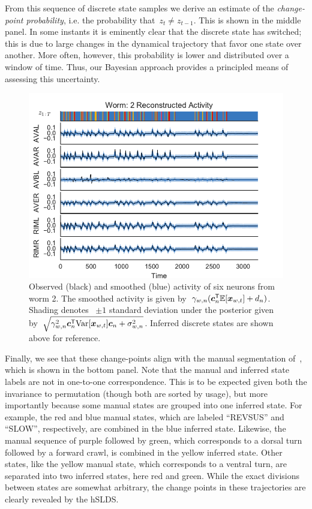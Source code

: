 \documentclass{article}
\begin{document}
From this sequence of discrete state samples we derive an estimate of the
\emph{change-point probability}, i.e. the probability that~$z_t \neq z_{t-1}$.
This is shown in the middle panel. In some instants it is eminently clear
that the discrete state has switched; this is due to large changes in the
dynamical trajectory that favor one state over another. More often, however,
this probability is lower and distributed over a window of time. Thus, our
Bayesian approach provides a principled means of assessing this uncertainty.

\begin{figure}[t]
\centering%
\includegraphics[width=5.5in]{neural_activity_worm_1.pdf} 
\caption{Observed (black) and smoothed (blue) activity of six neurons
  from worm 2. The smoothed activity is given by~$\gamma_{w,n}
  (\boldsymbol{c}_n^{\mathsf{T}} \mathbb{E}[\boldsymbol{x}_{w,t}] + d_n)$. Shading denotes ~$\pm 1$
  standard deviation under the posterior given by~$\sqrt{\gamma_{w,n}^2 \boldsymbol{c}_n^{\mathsf{T}}
    \text{Var}[\boldsymbol{x}_{w,t}] \boldsymbol{c}_n + \sigma^2_{w,n}}$. Inferred discrete states
  are shown above for reference. }
\label{fig:neural_reconstruction}
\end{figure}


Finally, we see that these change-points align with the manual segmentation
of~\citet{kato2015global}, which is shown in the bottom panel. Note that the
manual and inferred state labels are not in one-to-one correspondence. This
is to be expected given both the invariance to permutation (though both are
sorted by usage), but more importantly because some manual states are grouped
into one inferred state. For example, the red and blue manual states, which
are labeled ``REVSUS'' and ``SLOW'', respectively, are combined in the blue
inferred state. Likewise, the manual sequence of purple followed by green,
which corresponds to a dorsal turn followed by a forward crawl, is combined
in the yellow inferred state.
Other states, like the yellow manual state, which corresponds
to a ventral turn, are separated into two inferred states, here red
and green. While the exact divisions between states are somewhat arbitrary,
the change points in these trajectories are clearly revealed by the hSLDS.
\end{document}
